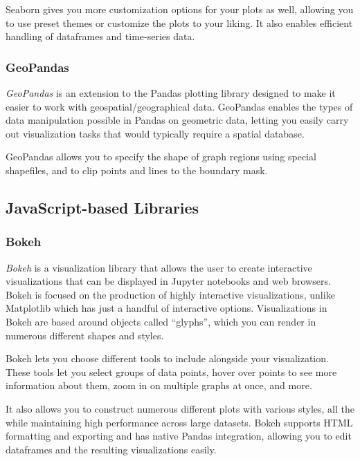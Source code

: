 \documentclass[11pt]{article}
\begin{document}
Seaborn gives you more customization options for your plots as well,
allowing you to use preset themes or customize the plots to your liking.
It also enables efficient handling of dataframes and time-series data.

\subsubsection{GeoPandas}\label{geopandas}

\emph{GeoPandas} is an extension to the Pandas plotting library designed
to make it easier to work with geospatial/geographical data. GeoPandas
enables the types of data manipulation possible in Pandas on geometric
data, letting you easily carry out visualization tasks that would
typically require a spatial database.

GeoPandas allows you to specify the shape of graph regions using special
shapefiles, and to clip points and lines to the boundary mask.

\subsection{JavaScript-based
Libraries}\label{javascript-based-libraries-1}

\subsubsection{Bokeh}\label{bokeh}

\emph{Bokeh} is a visualization library that allows the user to create
interactive visualizations that can be displayed in Jupyter notebooks
and web browsers. Bokeh is focused on the production of highly
interactive visualizations, unlike Matplotlib which has just a handful
of interactive options. Visualizations in Bokeh are based around objects
called ``glyphs'', which you can render in numerous different shapes and
styles.

Bokeh lets you choose different tools to include alongside your
visualization. These tools let you select groups of data points, hover
over points to see more information about them, zoom in on multiple
graphs at once, and more.

It also allows you to construct numerous different plots with various
styles, all the while maintaining high performance across large
datasets. Bokeh supports HTML formatting and exporting and has native
Pandas integration, allowing you to edit dataframes and the resulting
visualizations easily.
\end{document}
